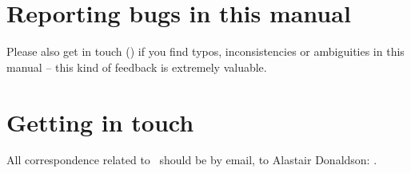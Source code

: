 \section{Reporting bugs in this manual}

Please also get in touch ()
if you find typos, inconsistencies or ambiguities in this manual --
this kind of feedback is extremely valuable.

\section{Getting in touch}\label{sec:troubleshooting:gettingintouch}

All correspondence related to \topspin\ should be by email, to
Alastair Donaldson: .
